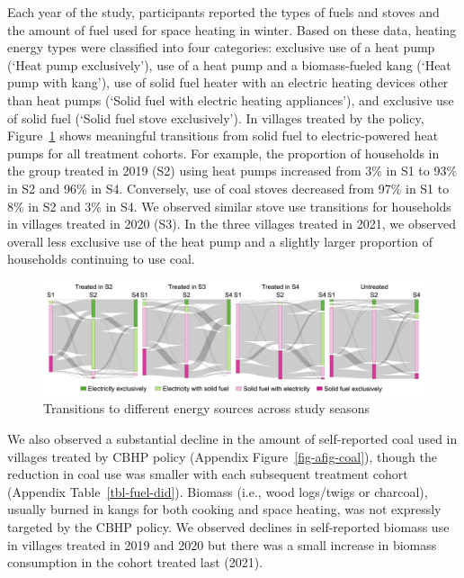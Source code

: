 \documentclass[
  letterpaper,
  DIV=11,
  numbers=noendperiod]{scrartcl}
\begin{document}
Each year of the study, participants reported the types of fuels and
stoves and the amount of fuel used for space heating in winter. Based on
these data, heating energy types were classified into four categories:
exclusive use of a heat pump (`Heat pump exclusively'), use of a heat
pump and a biomass-fueled kang (`Heat pump with kang'), use of solid
fuel heater with an electric heating devices other than heat pumps
(`Solid fuel with electric heating appliances'), and exclusive use of
solid fuel (`Solid fuel stove exclusively'). In villages treated by the
policy, Figure~\ref{fig-sankey} shows meaningful transitions from solid
fuel to electric-powered heat pumps for all treatment cohorts. For
example, the proportion of households in the group treated in 2019 (S2)
using heat pumps increased from 3\% in S1 to 93\% in S2 and 96\% in S4.
Conversely, use of coal stoves decreased from 97\% in S1 to 8\% in S2
and 3\% in S4. We observed similar stove use transitions for households
in villages treated in 2020 (S3). In the three villages treated in 2021,
we observed overall less exclusive use of the heat pump and a slightly
larger proportion of households continuing to use coal.

\begin{figure}[H]

{\centering \includegraphics[width=1\textwidth,height=\textheight]{images/Sankey diagram_2.png}

}

\caption{\label{fig-sankey}Transitions to different energy sources
across study seasons}

\end{figure}

We also observed a substantial decline in the amount of self-reported
coal used in villages treated by CBHP policy (Appendix
Figure~\ref{fig-afig-coal}), though the reduction in coal use was
smaller with each subsequent treatment cohort (Appendix
Table~\ref{tbl-fuel-did}). Biomass (i.e., wood logs/twigs or charcoal),
usually burned in kangs for both cooking and space heating, was not
expressly targeted by the CBHP policy. We observed declines in
self-reported biomass use in villages treated in 2019 and 2020 but there
was a small increase in biomass consumption in the cohort treated last
(2021).
\end{document}
